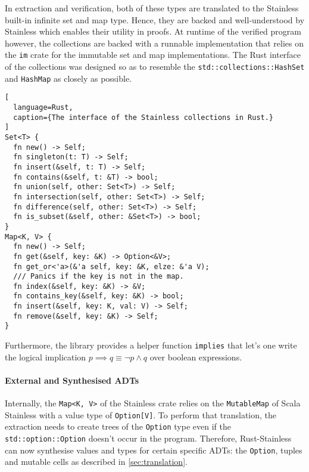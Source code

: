 In extraction and verification, both of these types are translated to
the Stainless built-in infinite set and map type. Hence, they are backed
and well-understood by Stainless which enables their utility in proofs.
At runtime of the verified program however, the collections are backed
with a runnable implementation that relies on the
\passthrough{\lstinline!im!} crate for the immutable set and map
implementations. The Rust interface of the collections was designed so
as to resemble the \passthrough{\lstinline!std::collections::HashSet!}
and \passthrough{\lstinline!HashMap!} as closely as possible.

\begin{lstlisting}[
  language=Rust,
  caption={The interface of the Stainless collections in Rust.}
]
Set<T> {
  fn new() -> Self;
  fn singleton(t: T) -> Self;
  fn insert(&self, t: T) -> Self;
  fn contains(&self, t: &T) -> bool;
  fn union(self, other: Set<T>) -> Self;
  fn intersection(self, other: Set<T>) -> Self;
  fn difference(self, other: Set<T>) -> Self;
  fn is_subset(&self, other: &Set<T>) -> bool;
}
Map<K, V> {
  fn new() -> Self;
  fn get(&self, key: &K) -> Option<&V>;
  fn get_or<'a>(&'a self, key: &K, elze: &'a V);
  /// Panics if the key is not in the map.
  fn index(&self, key: &K) -> &V;
  fn contains_key(&self, key: &K) -> bool;
  fn insert(&self, key: K, val: V) -> Self;
  fn remove(&self, key: &K) -> Self;
}
\end{lstlisting}

Furthermore, the library provides a helper function
\passthrough{\lstinline!implies!} that let's one write the logical
implication $p \implies q \equiv \neg{p} \land q$ over boolean expressions.


\paragraph{External and Synthesised ADTs}

Internally, the \lstinline!Map<K, V>! of the Stainless crate relies on
the \passthrough{\lstinline!MutableMap!} of Scala Stainless with a value
type of \passthrough{\lstinline!Option[V]!}. To perform that
translation, the extraction needs to create trees of the
\passthrough{\lstinline!Option!} type even if the
\passthrough{\lstinline!std::option::Option!} doesn't occur in the
program. Therefore, Rust-Stainless can now synthesise values and types
for certain specific ADTs: the \passthrough{\lstinline!Option!}, tuples
and mutable cells as described in \autoref{sec:translation}.

